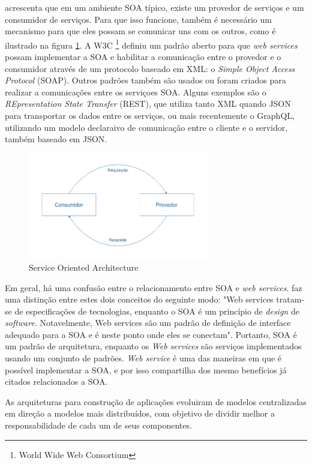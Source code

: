  acrescenta que em um ambiente SOA típico, existe um provedor de serviços e um consumidor de serviços. Para que isso funcione, também é necessário um mecanismo para que eles possam se comunicar uns com os outros, como é ilustrado na figura \ref{fig:soa}. A W3C \footnote{World Wide Web Consortium} definiu um padrão aberto para que \textit{web services} possam implementar a SOA e habilitar a comunicação entre o provedor e o consumidor através de um protocolo baseado em XML: o \textit{Simple Object Access Protocol} (SOAP). Outros padrões também são usados ou foram criados para realizar a comunicações entre os serviçoes SOA. Alguns exemplos são o \textit{REpresentation State Transfer} (REST), que utiliza tanto XML quando JSON para transportar os dados entre os serviços, ou mais recentemente o GraphQL, utilizando um modelo declaraivo de comunicação entre o cliente e o servidor, também baseado em JSON.

\begin{figure}[htbp]
    \centering
    \includegraphics[width=0.7\textwidth]{figuras/soa.png}
    \caption{Service Oriented Architecture}
    \label{fig:soa}
\end{figure}

Em geral, há uma confusão entre o relacionamento entre SOA e \textit{web services}.  faz uma distinção entre estes dois conceitos do seguinte modo: "Web services tratam-se de especificações de tecnologias, enquanto o SOA é um princípio de \textit{design} de \textit{software}. Notavelmente, Web services são um padrão de definição de interface adequado para a SOA e é neste ponto onde eles se conectam". Portanto, SOA é um padrão de arquitetura, enquanto os \textit{Web services} são serviços implementados usando um conjunto de padrões. \textit{Web service} é uma das maneiras em que é possível implementar a SOA, e por isso compartilha dos mesmo benefícios já citados relacionados a SOA.

As arquiteturas para construção de aplicações evoluiram de modelos centralizadas em direção a modelos mais distribuídos, com objetivo de dividir melhor a responsabilidade de cada um de seus componentes. 